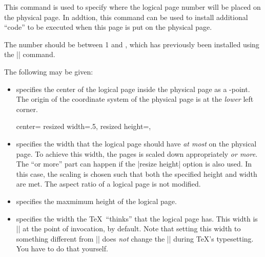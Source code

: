 \begin{command}{\pgfsetuppage{}}
  This command is used to specify where the logical page number
   will be placed on the physical page. In
  addtion, this command can be used to install additional ``code'' to
  be executed when this page is put on the physical page.

  The number  should be between 1 and
  , which has previously been installed using the
  |\pgfpageoptions| command.

  The following  may be given:
  \begin{itemize}
  \item
    specifies the center of the logical page inside the physical page
    as a \pgfname-point. The origin of the coordinate system of the
    physical page is at the \emph{lower} left corner.

\begin{codeexample}
{%
  center=\pgfpoint{.25\pgfphysicalwidth}{.5\pgfphysicalheight}%
  resized width=.5\pgfphysicalwidth,%
  resized height=\pgfphysicalheight,%
}
\end{codeexample}

  \item
    specifies the width that the logical page should have \emph{at
    most} on the physical page. To achieve this width, the pages is
    scaled down appropriately \emph{or more}. The ``or more'' part
    can happen if the |resize height| option is also used. In this
    case, the scaling is chosen such that both the specified height
    and width are met. The aspect ratio of a logical page is not
    modified.
  \item
    specifies the maxmimum height of the logical page.
  \item
    specifies the width the \TeX\ ``thinks'' that the logical page
    has. This width is |\paperwidth| at the point of invocation, by
    default. Note that setting this width to something different from
    |\paperwidth| does \emph{not} change the |\pagewidth| during
    \TeX's typesetting. You have to do that yourself.


\end{itemize}
\end{command}

